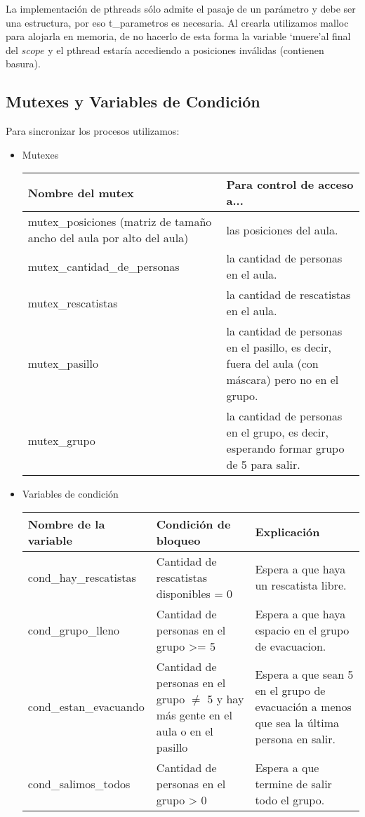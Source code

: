 La implementación de pthreads sólo admite el pasaje de un parámetro y debe
ser una estructura, por eso t\_parametros es necesaria. Al crearla utilizamos malloc para alojarla en memoria, 
de no hacerlo de esta forma la variable \textquoteleft muere\textquoteright al final del $scope$ y
el pthread estaría accediendo a posiciones inválidas (contienen basura).

\subsection{Mutexes y Variables de Condición}
Para sincronizar los procesos utilizamos:

\begin{itemize}
\item Mutexes
  \medskip

  \begin{tabular}{|p{7.5cm}|p{9cm}|}
  \hline
  Nombre del mutex & Para control de acceso a... \\
  \hline
  mutex\_posiciones (matriz de tamaño ancho del aula por alto del aula) & las posiciones del aula. \\
  \hline
  mutex\_cantidad\_de\_personas & la cantidad de personas en el aula. \\
  \hline
  mutex\_rescatistas & la cantidad de rescatistas en el aula. \\
  \hline
  mutex\_pasillo & la cantidad de personas en el pasillo, es decir, fuera del aula (con máscara) pero no en el grupo. \\
  \hline
  mutex\_grupo & la cantidad de personas en el grupo, es decir, esperando formar grupo de 5 para salir. \\
  \hline
  \end{tabular}

\item Variables de condición
  \medskip

  \begin{tabular}{|l|p{5cm}|p{7cm}|}
  \hline
  Nombre de la variable & Condición de bloqueo & Explicación  \\
  \hline
  cond\_hay\_rescatistas & Cantidad de rescatistas disponibles = 0 & Espera a que haya un rescatista libre. \\ %
  \hline
  cond\_grupo\_lleno & Cantidad de personas en el grupo >= 5 & Espera a que haya espacio en el grupo de evacuacion. \\ %
  \hline
  cond\_estan\_evacuando & Cantidad de personas en el grupo $\neq$ 5 y hay más gente en el aula o en el pasillo & Espera a que sean 5 en el grupo de 
    evacuación a menos que sea la última persona en salir. \\ %
  \hline
  cond\_salimos\_todos & Cantidad de personas en el grupo > 0 & Espera a que termine de salir todo el grupo. \\ %
  \hline
  \end{tabular}

\end{itemize}
